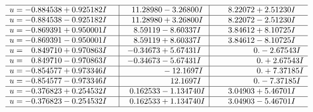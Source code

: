\documentclass[1p]{elsarticle_modified}
\theoremstyle{definition}
\begin{document}
$$\begin{array}{c|c|c}
 \hline 
\begin{aligned}
u &= -0.884538 + 0.925182 I\end{aligned}
 & \phantom{-}11.28980 - 3.26800 I & \phantom{-}8.22072 + 2.51230 I \\ \hline\begin{aligned}
u &= -0.884538 - 0.925182 I\end{aligned}
 & \phantom{-}11.28980 + 3.26800 I & \phantom{-}8.22072 - 2.51230 I \\ \hline\begin{aligned}
u &= -0.869391 + 0.950001 I\end{aligned}
 & \phantom{-}8.59119 - 8.60337 I & \phantom{-}3.84612 + 8.10725 I \\ \hline\begin{aligned}
u &= -0.869391 - 0.950001 I\end{aligned}
 & \phantom{-}8.59119 + 8.60337 I & \phantom{-}3.84612 - 8.10725 I \\ \hline\begin{aligned}
u &= \phantom{-}0.849710 + 0.970863 I\end{aligned}
 & -0.34673 + 5.67431 I & \phantom{-0.000000 } 0. - 2.67543 I \\ \hline\begin{aligned}
u &= \phantom{-}0.849710 - 0.970863 I\end{aligned}
 & -0.34673 - 5.67431 I & \phantom{-0.000000 -}0. + 2.67543 I \\ \hline\begin{aligned}
u &= -0.854577 + 0.973346 I\end{aligned}
 & \phantom{-0.000000 } -12.1697 I & \phantom{-0.000000 -}0. + 7.37185 I \\ \hline\begin{aligned}
u &= -0.854577 - 0.973346 I\end{aligned}
 & \phantom{-0.000000 -}12.1697 I & \phantom{-0.000000 } 0. - 7.37185 I \\ \hline\begin{aligned}
u &= -0.376823 + 0.254532 I\end{aligned}
 & \phantom{-}0.162533 - 1.134740 I & \phantom{-}3.04903 + 5.46701 I \\ \hline\begin{aligned}
u &= -0.376823 - 0.254532 I\end{aligned}
 & \phantom{-}0.162533 + 1.134740 I & \phantom{-}3.04903 - 5.46701 I\\
 \hline 
 \end{array}$$\newpage\newpage\renewcommand{\arraystretch}{1}
\end{document}

